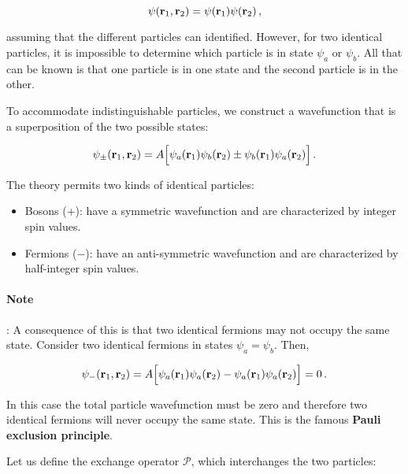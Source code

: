 \documentclass[12pt, titlepage]{article}
\begin{document}
\begin{equation}
\psi(\vb{r}_1,\vb{r}_2) = \psi(\vb{r}_1)\psi(\vb{r}_2) \,,
\end{equation}

assuming that the different particles can identified. However, for two identical particles, it is impossible to determine which particle is in state $\psi_a$ or $\psi_b$. All that can be known is that one particle is in one state and the second particle is in the other. 

To accommodate indistinguishable particles, we construct a wavefunction that is a superposition of the two possible states:

\begin{equation}
\psi_\pm(\vb{r}_1,\vb{r}_2) = A\Bigl[ \psi_a(\vb{r}_1)\psi_b(\vb{r}_2) \pm \psi_b(\vb{r}_1)\psi_a(\vb{r}_2) \Bigr] \,.
\end{equation}

The theory permits two kinds of identical particles:

\begin{itemize}
	\item  Bosons (+): have a symmetric wavefunction and are characterized by integer spin values.
	\item Fermions ($-$): have an anti-symmetric wavefunction and are characterized by half-integer spin values.
\end{itemize}

\begin{mdframed}
	\paragraph*{Note}:
	A consequence of this is that two identical fermions may not occupy the same state. Consider two identical fermions in states $\psi_a = \psi_b$. Then,
	
	\begin{equation*}
	\psi_-(\vb{r}_1,\vb{r}_2) =  A\Bigl[ \psi_a(\vb{r}_1)\psi_a(\vb{r}_2) - \psi_a(\vb{r}_1)\psi_a(\vb{r}_2) \Bigr] = 0 \,.
	\end{equation*}
	
	In this case the total particle wavefunction must be zero and therefore two identical fermions will never occupy the same state. This is the famous \textbf{Pauli exclusion principle}.	
\end{mdframed}

Let us define the exchange operator $\mathcal{P}$, which interchanges the two particles:
\end{document}
